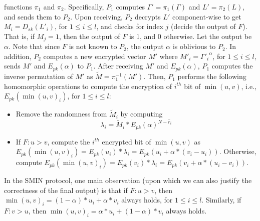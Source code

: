 \documentclass{article}
\begin{document}
functions $\pi_1$ and $\pi_2$. Specifically, $P_1$ computes $\Gamma' = \pi_1(\Gamma)$ and 
$L' = \pi_2(L)$, and sends them to $P_2$. Upon receiving, $P_2$ decrypts $L'$ component-wise to get 
$M_i = D_{sk}(L'_i)$, for $1 \leq i \leq l$, 
and checks for index $j$ (decide the output of $F$). That is, if 
$M_j = 1$, then the output of $F$ is 1, and 0 otherwise. Let the output 
be $\alpha$. Note that since 
$F$ is not known to $P_2$, the output $\alpha$ is oblivious to $P_2$. In addition, $P_2$ computes a new encrypted vector $M'$ where 
$M'_i = {\Gamma'_i}^{\alpha}$, for $1 \leq i \leq l$, sends $M'$ and $E_{pk}(\alpha)$ to 
$P_1$. After receiving $M'$ and $E_{pk}(\alpha)$, $P_1$ computes the inverse permutation of $M'$ 
as $\widetilde{M} = \pi_1^{-1}(M')$. Then, $P_1$ performs the following homomorphic 
operations to compute the encryption of $i^{th}$ bit of $\min(u, v)$, i.e., 
$E_{pk}(\min(u,v)_i)$, for $1 \leq i \leq l$:
\begin{itemize}
\item Remove the randomness from $\widetilde{M}_i$ by 
computing $$\lambda_i = \widetilde{M}_i\ast E_{pk}(\alpha)^{N -\hat{r}_i}$$
\item If $F: u>v$, compute the $i^{th}$ encrypted bit of $\min(u, v)$ as 
$E_{pk}(\min(u,v)_i) = E_{pk}(u_i)\ast \lambda_i = E_{pk}(u_i + \alpha*(v_i - u_i))$. Otherwise, compute
$E_{pk}(\min(u, v)_i) = E_{pk}(v_i)\ast \lambda_i = E_{pk}(v_i + \alpha*(u_i - v_i))$.
\end{itemize}
In the SMIN protocol, one main observation (upon 
which we can also justify the correctness of the final output) is that 
if $F:u > v$, then $\min(u,v)_i = (1-\alpha)*u_i + \alpha*v_i$ always holds, for $1 \le i \le l$. 
Similarly, if $F: v>u$, then $\min(u,v)_i = \alpha*u_i + (1-\alpha)*v_i$ always holds.
\end{document}

